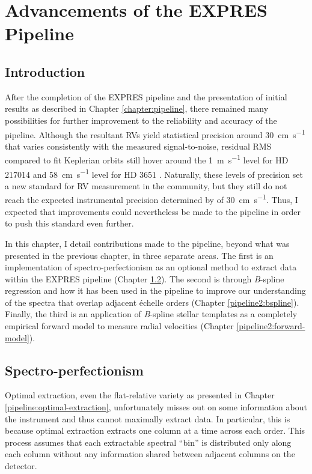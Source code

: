 \chapter{Advancements of the EXPRES Pipeline} \label{chapter:pipeline2}

\section{Introduction}

After the completion of the EXPRES pipeline and the presentation of initial results as described in Chapter \ref{chapter:pipeline}, there remained many possibilities for further improvement to the reliability and accuracy of the pipeline. Although the resultant RVs yield statistical precision around 30~\si{\centi\meter\per\second} that varies consistently with the measured signal-to-noise, residual RMS compared to fit Keplerian orbits still hover around the 1~\si{\meter\per\second} level for HD 217014 \citep{petersburg_extreme-precision_2020} and 58~\si{\centi\meter\per\second} level for HD 3651 \citep{brewer_expres_2020}. Naturally, these levels of precision set a new standard for RV measurement in the community, but they still do not reach the expected instrumental precision determined by \citet{blackman_performance_2020} of 30~\si{\centi\meter\per\second}. Thus, I expected that improvements could nevertheless be made to the pipeline in order to push this standard even further.

In this chapter, I detail contributions made to the pipeline, beyond what was presented in the previous chapter, in three separate areas. The first is an implementation of spectro-perfectionism as an optional method to extract data within the EXPRES pipeline (Chapter \ref{pipeline2:spec-perf}). The second is through \textit{B}-spline regression and how it has been used in the pipeline to improve our understanding of the spectra that overlap adjacent \'echelle orders (Chapter \ref{pipeline2:bspline}). Finally, the third is an application of \textit{B}-spline stellar templates as a completely empirical forward model to measure radial velocities (Chapter \ref{pipeline2:forward-model}).

\section{Spectro-perfectionism} \label{pipeline2:spec-perf}

Optimal extraction, even the flat-relative variety as presented in Chapter \ref{pipeline:optimal-extraction}, unfortunately misses out on some information about the instrument and thus cannot maximally extract data. In particular, this is because optimal extraction extracts one column at a time across each order. This process assumes that each extractable spectral ``bin'' is distributed only along each column without any information shared between adjacent columns on the detector.

